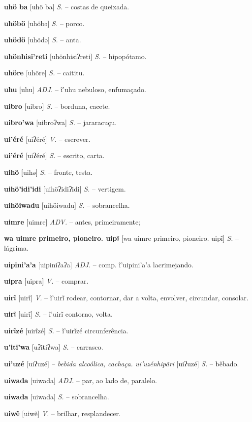 \textbf{uhö ba} [uhö ba] \textit{S.} -- costas de queixada.

\textbf{uhöbö} [uhöbə] \textit{S.} -- porco.

\textbf{uhödö} [uhödə] \textit{S.} -- anta.

\textbf{uhönhisi'reti} [uhönhisiʔreti] \textit{S.} -- hipopótamo.

\textbf{uhöre} [uhöre] \textit{S.} -- caititu.

\textbf{uhu} [uhu] \textit{ADJ.} -- ĩ'uhu nebuloso, enfumaçado.

\textbf{uibro} [uibro] \textit{S.} -- borduna, cacete.

\textbf{uibro'wa} [uibroʔwa] \textit{S.} -- jararacuçu.

\textbf{ui'éré} [uiʔéré] \textit{V.} -- escrever.

\textbf{ui'éré} [uiʔéré] \textit{S.} -- escrito, carta.

\textbf{uihö} [uihə] \textit{S.} -- fronte, testa.

\textbf{uihö'idi'idi} [uihöʔidiʔidi] \textit{S.} -- vertigem.

\textbf{uihöiwadu} [uihöiwadu] \textit{S.} -- sobrancelha.

\textbf{uimre} [uimre] \textit{ADV.} -- antes, primeiramente;

\textbf{wa uimre primeiro, pioneiro. uipĩ} [wa uimre primeiro, pioneiro. uipĩ] \textit{S.} -- lágrima.

\textbf{uipini'a'a} [uipiniʔaʔa] \textit{ADJ.} -- comp. ĩ'uipini'a'a lacrimejando.

\textbf{uipra} [uipra] \textit{V.} -- comprar.

\textbf{uirĩ} [uirĩ] \textit{V.} -- ĩ'uirĩ rodear, contornar, dar a volta, envolver, circundar, consolar.

\textbf{uirĩ} [uirĩ] \textit{S.} -- ĩ'uirĩ contorno, volta.

\textbf{uirĩzé} [uirĩzé] \textit{S.} -- ĩ'uirĩzé circunferência.

\textbf{u'iti'wa} [uʔitiʔwa] \textit{S.} -- carrasco.

\textbf{ui'uzé} [uiʔuzé] \textit{-- bebida alcoólica, cachaça. ui'uzénhipãri} [uiʔuzé] \textit{S.} -- bêbado.

\textbf{uiwada} [uiwada] \textit{ADJ.} -- par, ao lado de, paralelo.

\textbf{uiwada} [uiwada] \textit{S.} -- sobrancelha.

\textbf{uiwẽ} [uiwẽ] \textit{V.} -- brilhar, resplandecer.

